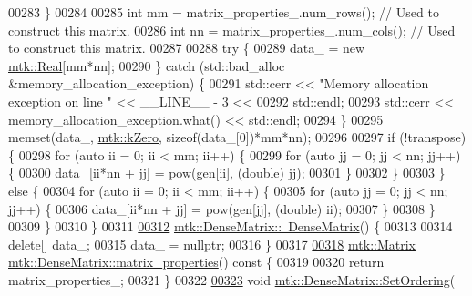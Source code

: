 \begin{DoxyCode}
00283   \}
00284 
00285   \textcolor{keywordtype}{int} mm = matrix\_properties\_.num\_rows(); \textcolor{comment}{// Used to construct this matrix.}
00286   \textcolor{keywordtype}{int} nn = matrix\_properties\_.num\_cols(); \textcolor{comment}{// Used to construct this matrix.}
00287 
00288   \textcolor{keywordflow}{try} \{
00289     data\_ = \textcolor{keyword}{new} \hyperlink{group__c01-roots_gac080bbbf5cbb5502c9f00405f894857d}{mtk::Real}[mm*nn];
00290   \} \textcolor{keywordflow}{catch} (std::bad\_alloc &memory\_allocation\_exception) \{
00291     std::cerr << \textcolor{stringliteral}{"Memory allocation exception on line "} << \_\_LINE\_\_ - 3 <<
00292       std::endl;
00293     std::cerr << memory\_allocation\_exception.what() << std::endl;
00294   \}
00295   memset(data\_, \hyperlink{group__c01-roots_ga59a451a5fae30d59649bcda274fea271}{mtk::kZero}, \textcolor{keyword}{sizeof}(data\_[0])*mm*nn);
00296 
00297   \textcolor{keywordflow}{if} (!transpose) \{
00298     \textcolor{keywordflow}{for} (\textcolor{keyword}{auto} ii = 0; ii < mm; ii++) \{
00299       \textcolor{keywordflow}{for} (\textcolor{keyword}{auto} jj = 0; jj < nn; jj++) \{
00300         data\_[ii*nn + jj] = pow(gen[ii], (\textcolor{keywordtype}{double}) jj);
00301       \}
00302     \}
00303   \} \textcolor{keywordflow}{else} \{
00304     \textcolor{keywordflow}{for} (\textcolor{keyword}{auto} ii = 0; ii < mm; ii++) \{
00305       \textcolor{keywordflow}{for} (\textcolor{keyword}{auto} jj = 0; jj < nn; jj++) \{
00306         data\_[ii*nn + jj] = pow(gen[jj], (\textcolor{keywordtype}{double}) ii);
00307       \}
00308     \}
00309   \}
00310 \}
00311 
\hypertarget{mtk__dense__matrix_8cc_source_l00312}{}\hyperlink{classmtk_1_1DenseMatrix_a8d4a0df33bd4e4edf5d2fe5539885b85}{00312} \hyperlink{classmtk_1_1DenseMatrix_a8d4a0df33bd4e4edf5d2fe5539885b85}{mtk::DenseMatrix::~DenseMatrix}() \{
00313 
00314   \textcolor{keyword}{delete}[] data\_;
00315   data\_ = \textcolor{keyword}{nullptr};
00316 \}
00317 
\hypertarget{mtk__dense__matrix_8cc_source_l00318}{}\hyperlink{classmtk_1_1DenseMatrix_abb5e4db5688743c6f9fd9ec6e38ed4ca}{00318} \hyperlink{classmtk_1_1Matrix}{mtk::Matrix} \hyperlink{classmtk_1_1DenseMatrix_abb5e4db5688743c6f9fd9ec6e38ed4ca}{mtk::DenseMatrix::matrix\_properties}()\textcolor{keyword}{ const }\{
00319 
00320   \textcolor{keywordflow}{return} matrix\_properties\_;
00321 \}
00322 
\hypertarget{mtk__dense__matrix_8cc_source_l00323}{}\hyperlink{classmtk_1_1DenseMatrix_aacae136ae446cad8f0d81476e83efb39}{00323} \textcolor{keywordtype}{void} \hyperlink{classmtk_1_1DenseMatrix_aacae136ae446cad8f0d81476e83efb39}{mtk::DenseMatrix::SetOrdering}(

\end{DoxyCode}
